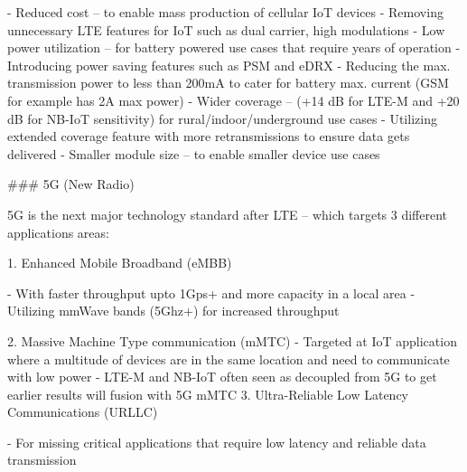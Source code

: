 \documentclass[11pt, oneside]{article}   	%
\newcommand{\addspace}{\vspace{2mm}}
\begin{document}
\begin{markdown}
- Reduced cost -- to enable mass production of cellular IoT devices
    - Removing unnecessary LTE features for IoT such as dual carrier, high modulations
- Low power utilization -- for battery powered use cases that require years of operation
    - Introducing power saving features such as PSM and eDRX
    - Reducing the max. transmission power to less than 200mA to cater for battery max. current (GSM for example has 2A max power) 
- Wider coverage -- (+14 dB for LTE-M and +20 dB for NB-IoT sensitivity) for rural/indoor/underground use cases
    - Utilizing extended coverage feature with more retransmissions to ensure data gets delivered 
- Smaller module size -- to enable smaller device use cases

### 5G (New Radio)

5G is the next major technology standard after LTE -- which targets 3 different applications areas:
\end{markdown}
\addspace
\begin{markdown}
1. Enhanced Mobile Broadband (eMBB)
\end{markdown}
\addspace
\begin{markdown}
  - With faster throughput upto 1Gps+ and more capacity in a local area
  - Utilizing mmWave bands (5Ghz+) for increased throughput
\end{markdown}
\addspace
\begin{markdown}
2. Massive Machine Type communication (mMTC)  
  - Targeted at IoT application where a multitude of devices are in the same location and need to communicate with low power
  - LTE-M and NB-IoT often seen as decoupled from 5G to get earlier results will fusion with 5G mMTC  
3. Ultra-Reliable Low Latency Communications (URLLC)
\end{markdown}
\addspace
\begin{markdown}
  - For missing critical applications that require low latency and reliable data transmission
\end{markdown}
\addspace
\end{document}
